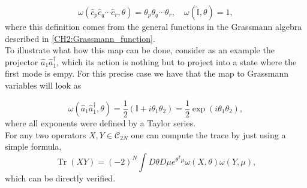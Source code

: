 \begin{equation}
\omega\left(\hat{c}_{p} \hat{c}_{q} \cdots \hat{c}_{r}, \theta\right)=\theta_{p} \theta_{q} \cdots \theta_{r}, \quad \omega(\hat{\mathbb{I}}, \theta)=1,
\label{CH2:Gaussian_majorana_map_majorana}
\end{equation}
where this definition comes from the general functions in the Grassmann algebra described in \eqref{CH2:Grassmann_function}.\\


\indent To illustrate what how this map can be done, consider as an example the projector $\hat{a}_1\hat{a}_1^{\dagger}$, which its action is nothing but to project into a state where the first mode is empy. For this precise case we have that the map to Grassmann variables will look as

\begin{equation}
\omega(\hat{a}_1\hat{a}_1^{\dagger}, \theta)=\frac{1}{2} \left(\mathbb{I}+ i \theta_1\theta_2\right) =\frac{1}{2}  \exp \left(i \theta_1\theta_2\right),
\label{CH2:Gaussian_Grassmann}
\end{equation}
where all exponents were defined by a Taylor series.\\
\indent For any two operators $X,Y\in \mathcal{C}_{2N}$ one can compute the trace by just using a simple formula,
\begin{equation}
\operatorname{Tr}(X Y)=(-2)^{N} \int D \theta D \mu e^{\theta^{T} \mu} \omega(X, \theta) \omega(Y, \mu),
\label{CH2:Trace_grassmann_operators}
\end{equation}
 which can be directly verified.\\
 
